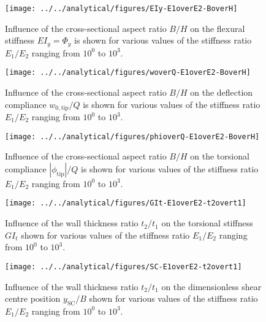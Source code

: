 \begin{figure}[!htpb] %
  \centering
  \texttt{[image: ../../analytical/figures/EIy-E1overE2-BoverH]}
  \caption[Influence of the cross-sectional aspect ratio $B/H$ on the flexural stiffness $EI_y$]{Influence of the cross-sectional aspect ratio $B/H$ on the flexural stiffness $EI_y = \Phi_y$ is shown for various values of the stiffness ratio $E_1/E_2$ ranging from $10^0$ to $10^3$. }\label{fig:EIy-E1overE2-BoverH}
\end{figure}

\begin{figure}[!htpb] %
  \centering
  \texttt{[image: ../../analytical/figures/woverQ-E1overE2-BoverH]}
  \caption[Influence of the cross-sectional aspect ratio $B/H$ on the deflection compliance]{Influence of the cross-sectional aspect ratio $B/H$ on the deflection compliance $w_{\mathrm{0,tip}} / Q$ is shown for various values of the stiffness ratio $E_1/E_2$ ranging from $10^0$ to $10^3$. }\label{fig:woverQ-E1overE2-BoverH}
\end{figure}

\begin{figure}[!htpb] %
  \centering
  \texttt{[image: ../../analytical/figures/phioverQ-E1overE2-BoverH]}
  \caption[Influence of the cross-sectional aspect ratio $B/H$ on the torsional compliance]{Influence of the cross-sectional aspect ratio $B/H$ on the torsional compliance $|\phi_{\mathrm{tip}}| / Q$ is shown for various values of the stiffness ratio $E_1/E_2$ ranging from $10^0$ to $10^3$. }\label{fig:phioverQ-E1overE2-BoverH}
\end{figure}

\begin{figure}[!htpb] %
  \centering
  \texttt{[image: ../../analytical/figures/GIt-E1overE2-t2overt1]}
  \caption[Influence of the wall thickness ratio $t_2/t_1$ on the torsional stiffness $GI_t$]{Influence of the wall thickness ratio $t_2/t_1$ on the torsional stiffness $GI_t$ shown for various values of the stiffness ratio $E_1/E_2$ ranging from $10^0$ to $10^3$. }\label{fig:GIt-E1overE2-t2overt1}
\end{figure}

\begin{figure}[!htpb] %
  \centering
  \texttt{[image: ../../analytical/figures/SC-E1overE2-t2overt1]}
  \caption[Influence of the wall thickness ratio $t_2/t_1$ on the dimensionless shear centre position $y_{\mathrm{SC}}/B$]{Influence of the wall thickness ratio $t_2/t_1$ on the dimensionless shear centre position $y_{\mathrm{SC}}/B$ shown for various values of the stiffness ratio $E_1/E_2$ ranging from $10^0$ to $10^3$. }\label{fig:SC-E1overE2-t2overt1}
\end{figure}

